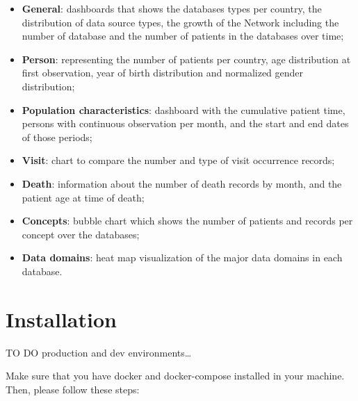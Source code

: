 \documentclass[]{book}
\providecommand{\tightlist}{%
  \setlength{\itemsep}{0pt}\setlength{\parskip}{0pt}}
\begin{document}
\begin{itemize}
\tightlist
\item
  \textbf{General}: dashboards that shows the databases types per
  country, the distribution of data source types, the growth of the
  Network including the number of database and the number of patients in
  the databases over time;
\item
  \textbf{Person}: representing the number of patients per country, age
  distribution at first observation, year of birth distribution and
  normalized gender distribution;
\item
  \textbf{Population characteristics}: dashboard with the cumulative
  patient time, persons with continuous observation per month, and the
  start and end dates of those periods;
\item
  \textbf{Visit}: chart to compare the number and type of visit
  occurrence records;
\item
  \textbf{Death}: information about the number of death records by
  month, and the patient age at time of death;
\item
  \textbf{Concepts}: bubble chart which shows the number of patients and
  records per concept over the databases;
\item
  \textbf{Data domains}: heat map visualization of the major data
  domains in each database.
\end{itemize}

\chapter{Installation}\label{installation}

TO DO production and dev environments\ldots{}

Make sure that you have docker and docker-compose installed in your
machine. Then, please follow these steps:
\end{document}
